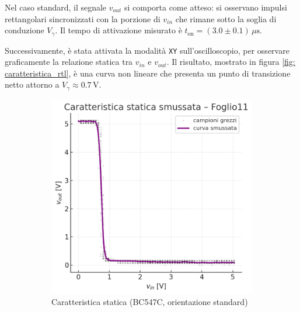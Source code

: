 \documentclass[a4paper,12pt]{article}
\begin{document}
Nel caso standard, il segnale \(v_{out}\) si comporta come atteso: si osservano impulsi rettangolari sincronizzati con la porzione di \(v_{in}\) che rimane sotto la soglia di conduzione \(V_\gamma\). Il tempo di attivazione misurato è \(t_{\text{on}} = (3.0 \pm 0.1)\,\mu\mathrm{s}\).

Successivamente, è stata attivata la modalità \texttt{XY} sull’oscilloscopio, per osservare graficamente la relazione statica tra \(v_{in}\) e \(v_{out}\). Il risultato, mostrato in figura \ref{fig: caratteristica_rtl}, è una curva non lineare che presenta un punto di transizione netto attorno a \(V_{\gamma} \approx 0.7\,\mathrm{V}\).

\begin{figure}[H] \label{fig: caratteristica_rtl}
  \centering
  \begin{subfigure}{0.45\textwidth}
    \includegraphics[width=\linewidth]{caratteristica_statica.png}
    \caption{Caratteristica statica (BC547C, orientazione standard)}
  \end{subfigure}
  \hfill
  \begin{subfigure}{0.45\textwidth}

\end{subfigure}
\end{figure}
\end{document}
